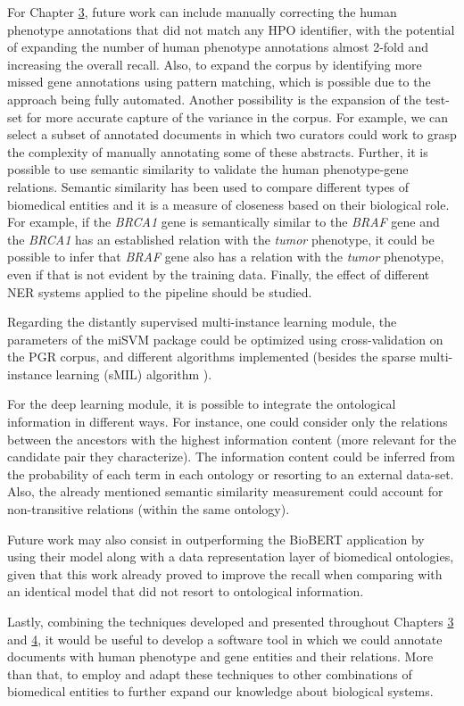 For Chapter \hyperlink{3}{3}, future work can include manually correcting the human phenotype annotations that did not match any HPO identifier, with the potential of expanding the number of human phenotype annotations almost 2-fold and increasing the overall recall. Also, to expand the corpus by identifying more missed gene annotations using pattern matching, which is possible due to the approach being fully automated. Another possibility is the expansion of the test-set for more accurate capture of the variance in the corpus. For example, we can select a subset of annotated documents in which two curators could work to grasp the complexity of manually annotating some of these abstracts. Further, it is possible to use semantic similarity to validate the human phenotype-gene relations. Semantic similarity has been used to compare different types of biomedical entities \citep{SSM} and it is a measure of closeness based on their biological role. For example, if the \textit{BRCA1} gene is semantically similar to the \textit{BRAF} gene and the \textit{BRCA1} has an established relation with the \textit{tumor} phenotype, it could be possible to infer that \textit{BRAF} gene also has a relation with the \textit{tumor} phenotype, even if that is not evident by the training data. Finally, the effect of different NER systems applied to the pipeline should be studied.

Regarding the distantly supervised multi-instance learning module, the parameters of the miSVM package could be optimized using cross-validation on the PGR corpus, and different algorithms implemented (besides the sparse multi-instance learning (sMIL) algorithm \citep{Bunescu:2007:MIL:1273496.1273510}). 

For the deep learning module, it is possible to integrate the ontological information in different ways. For instance, one could consider only the relations between the ancestors with the highest information content (more relevant for the candidate pair they characterize). The information content could be inferred from the probability of each term in each ontology or resorting to an external data-set. Also, the already mentioned semantic similarity measurement could account for non-transitive relations (within the same ontology).

Future work may also consist in outperforming the BioBERT application by using their model along with a data representation layer of biomedical ontologies, given that this work already proved to improve the recall when comparing with an identical model that did not resort to ontological information.

Lastly, combining the techniques developed and presented throughout Chapters \hyperlink{3}{3} and \hyperlink{4}{4}, it would be useful to develop a software tool in which we could annotate documents with human phenotype and gene entities and their relations. More than that, to employ and adapt these techniques to other combinations of biomedical entities to further expand our knowledge about biological systems. 
